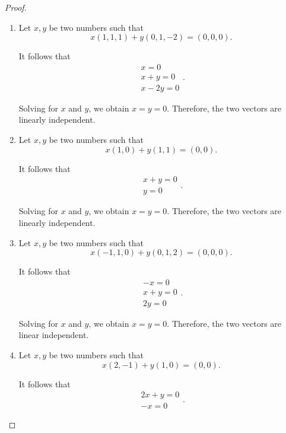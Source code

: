 \begin{proof}
    \begin{enumerate}[label={(\alph*)},itemsep=0pt]
        \item Let $x, y$ be two numbers such that
              \[
                  x(1, 1, 1) + y(0, 1, -2) = (0, 0, 0).
              \]

              It follows that
              \[
                  \begin{split}
                      x = 0 \\
                      x + y = 0 \\
                      x - 2y = 0
                  \end{split}.
              \]

              Solving for $x$ and $y$, we obtain $x = y = 0$. Therefore, the two vectors are linearly independent.
        \item Let $x, y$ be two numbers such that
              \[
                  x(1, 0) + y(1, 1) = (0, 0).
              \]

              It follows that
              \[
                  \begin{split}
                      x + y = 0 \\
                      y = 0
                  \end{split}.
              \]

              Solving for $x$ and $y$, we obtain $x = y = 0$. Therefore, the two vectors are linearly independent.
        \item Let $x, y$ be two numbers such that
              \[
                  x(-1, 1, 0) + y(0, 1, 2) = (0, 0, 0).
              \]

              It follows that
              \[
                  \begin{split}
                      -x = 0 \\
                      x + y = 0 \\
                      2y = 0
                  \end{split}.
              \]

              Solving for $x$ and $y$, we obtain $x = y = 0$. Therefore, the two vectors are linear independent.
        \item Let $x, y$ be two numbers such that
              \[
                  x(2, -1) + y(1, 0) = (0, 0).
              \]

              It follows that
              \[
                  \begin{split}
                      2x + y = 0 \\
                      -x = 0
                  \end{split}.
              \]


\end{enumerate}
\end{proof}
